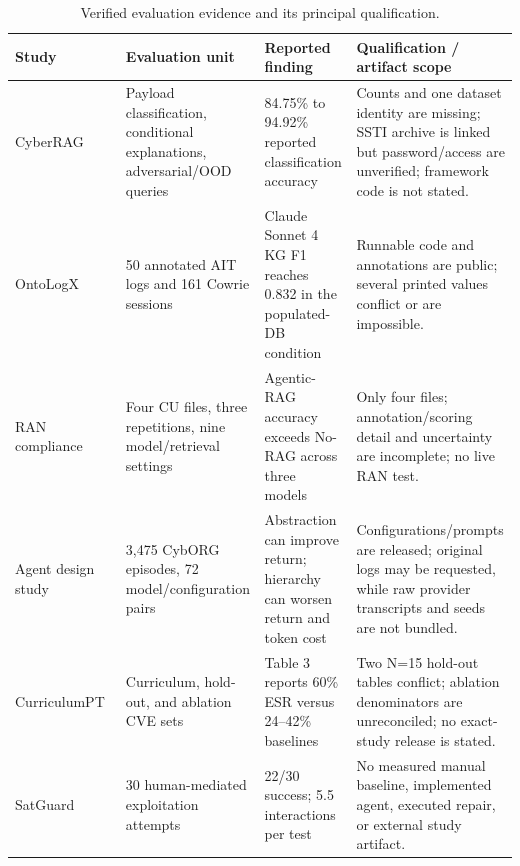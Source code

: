 \begin{table}[tbp]
  \caption{Verified evaluation evidence and its principal qualification.}\label{tab:comparison-2}
  \scriptsize
  \begin{tabular}{@{}p{}p{}p{}p{}@{}}
    \toprule
    Study & Evaluation unit & Reported finding & Qualification / artifact scope \\
    \midrule
    CyberRAG~\cite{R0447_Blefari_2026} & Payload classification, conditional explanations, adversarial/OOD queries & 84.75\% to 94.92\% reported classification accuracy & Counts and one dataset identity are missing; SSTI archive is linked but password/access are unverified; framework code is not stated. \\
    OntoLogX~\cite{R0365_Cotti_2026} & 50 annotated AIT logs and 161 Cowrie sessions & Claude Sonnet 4 KG F1 reaches 0.832 in the populated-DB condition & Runnable code and annotations are public; several printed values conflict or are impossible. \\
    RAN compliance~\cite{R0340_Chatzimiltis_2026} & Four CU files, three repetitions, nine model/retrieval settings & Agentic-RAG accuracy exceeds No-RAG across three models & Only four files; annotation/scoring detail and uncertainty are incomplete; no live RAN test. \\
    Agent design study~\cite{R0484_Bogdanov_2026} & 3,475 CybORG episodes, 72 model/configuration pairs & Abstraction can improve return; hierarchy can worsen return and token cost & Configurations/prompts are released; original logs may be requested, while raw provider transcripts and seeds are not bundled. \\
    CurriculumPT~\cite{R0322_Wu_2025} & Curriculum, hold-out, and ablation CVE sets & Table 3 reports 60\% ESR versus 24--42\% baselines & Two N=15 hold-out tables conflict; ablation denominators are unreconciled; no exact-study release is stated. \\
    SatGuard~\cite{R0384_Xiao_2025} & 30 human-mediated exploitation attempts & 22/30 success; 5.5 interactions per test & No measured manual baseline, implemented agent, executed repair, or external study artifact. \\
    \bottomrule
  \end{tabular}
\end{table}
